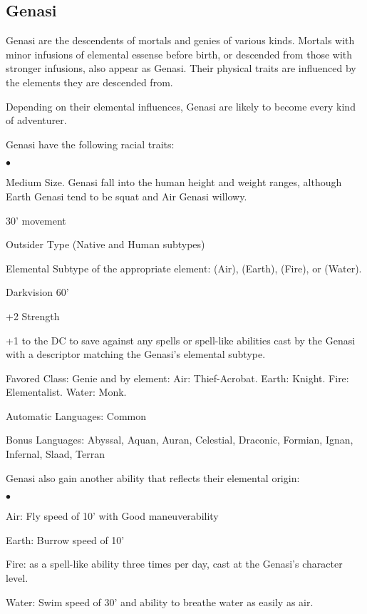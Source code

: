 \subsection{Genasi}
\vspace*{-8pt}

Genasi are the descendents of mortals and genies of various kinds.  Mortals with minor infusions of elemental essense before birth, or descended from those with stronger infusions, also appear as Genasi.  Their physical traits are influenced by the elements they are descended from.

Depending on their elemental influences, Genasi are likely to become every kind of adventurer.

Genasi have the following racial traits:
\begin{list}{$\bullet$}{\itemspace}
    \item Medium Size. Genasi fall into the human height and weight ranges, although Earth Genasi tend to be squat and Air Genasi willowy.
    \item 30' movement
    \item Outsider Type (Native and Human subtypes)
    \item Elemental Subtype of the appropriate element: (Air), (Earth), (Fire), or (Water).
    \item Darkvision 60'
    \item +2 Strength
    \item +1 to the DC to save against any spells or spell-like abilities cast by the Genasi with a descriptor matching the Genasi's elemental subtype.
    \item Favored Class: Genie and by element: Air: Thief-Acrobat.  Earth: Knight.  Fire: Elementalist.  Water: Monk.
    \item Automatic Languages: Common
    \item Bonus Languages: Abyssal, Aquan, Auran, Celestial, Draconic, Formian, Ignan, Infernal, Slaad, Terran
\end{list}

Genasi also gain another ability that reflects their elemental origin:
\begin{list}{$\bullet$}{\itemspace}
    \item Air: Fly speed of 10' with Good maneuverability
    \item Earth: Burrow speed of 10'
    \item Fire:  as a spell-like ability three times per day, cast at the Genasi's character level.  
    \item Water: Swim speed of 30' and ability to breathe water as easily as air.
\end{list}

